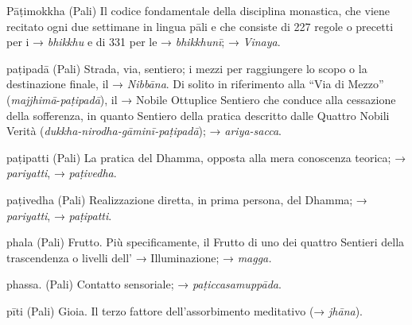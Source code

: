 \begin{glossarydescription}
\item[Pāṭimokkha] (Pali) Il codice fondamentale della disciplina monastica,
che viene recitato ogni due settimane in lingua pāli e che consiste di
227 regole o precetti per i → \emph{bhikkhu} e di 331 per le →
\emph{bhikkhunī}; → \emph{Vinaya}.

\item[paṭipadā] (Pali) Strada, via, sentiero; i mezzi per raggiungere lo scopo
o la destinazione finale, il → \emph{Nibbāna}. Di solito in riferimento
alla ``Via di Mezzo'' (\emph{majjhimā}-\emph{paṭipadā}), il → Nobile
Ottuplice Sentiero che conduce alla cessazione della sofferenza, in
quanto Sentiero della pratica descritto dalle Quattro Nobili Verità
(\emph{dukkha-nirodha-gāminī-paṭipadā}); → \emph{ariya-sacca}.

\item[paṭipatti] (Pali) La pratica del Dhamma, opposta alla mera conoscenza
teorica; → \emph{pariyatti}, → \emph{paṭivedha}.

\item[paṭivedha] (Pali) Realizzazione diretta, in prima persona, del Dhamma; →
\emph{pariyatti}, → \emph{paṭipatti}.

\item[phala] (Pali) Frutto. Più specificamente, il Frutto di uno dei quattro
Sentieri della trascendenza o livelli dell' → Illuminazione; →
\emph{magga.}

\item[phassa.] (Pali) Contatto sensoriale; → \emph{paṭiccasamuppāda}.

\item[pīti] (Pali) Gioia. Il terzo fattore dell'assorbimento meditativo (→
\emph{jhāna}).


\end{glossarydescription}
